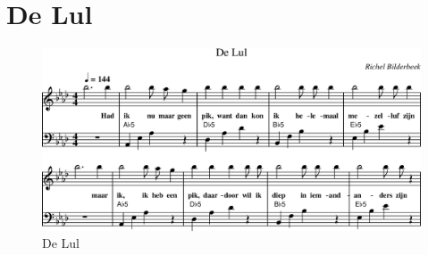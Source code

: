 \section{De Lul}



\begin{figure}[!htbp]
  \includegraphics[width=\textwidth,height=\textheight,keepaspectratio]{../songs/24_de_lul.png}
  \caption{De Lul}
  \label{fig:24_de_lul}
\end{figure}
